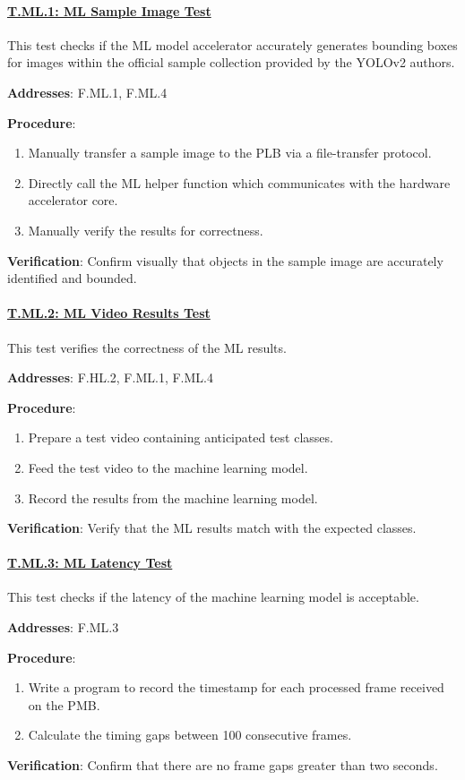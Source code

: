 \paragraph{\underline{T.ML.1: ML Sample Image Test}}

This test checks if the ML model accelerator accurately generates bounding boxes for images within the official sample collection provided by the YOLOv2 authors.

\textbf{Addresses}: F.ML.1, F.ML.4

\textbf{Procedure}:
\begin{enumerate}[noitemsep]
    \item Manually transfer a sample image to the PLB via a file-transfer protocol.
    \item Directly call the ML helper function which communicates with the hardware accelerator core.
    \item Manually verify the results for correctness.
\end{enumerate}

\textbf{Verification}: 
Confirm visually that objects in the sample image are accurately identified and bounded.

\paragraph{\underline{T.ML.2: ML Video Results Test}}

This test verifies the correctness of the ML results.

\textbf{Addresses}: F.HL.2, F.ML.1, F.ML.4

\textbf{Procedure}:
\begin{enumerate}[noitemsep]
    \item Prepare a test video containing anticipated test classes.
    \item Feed the test video to the machine learning model.
    \item Record the results from the machine learning model.
\end{enumerate}

\textbf{Verification}: 
Verify that the ML results match with the expected classes.

%
\paragraph{\underline{T.ML.3: ML Latency Test}}

This test checks if the latency of the machine learning model is acceptable.

\textbf{Addresses}: F.ML.3

\textbf{Procedure}:
\begin{enumerate}[noitemsep]
    \item Write a program to record the timestamp for each processed frame received on the PMB.
    \item Calculate the timing gaps between 100 consecutive frames.
\end{enumerate}

\textbf{Verification}: 
Confirm that there are no frame gaps greater than two seconds.
